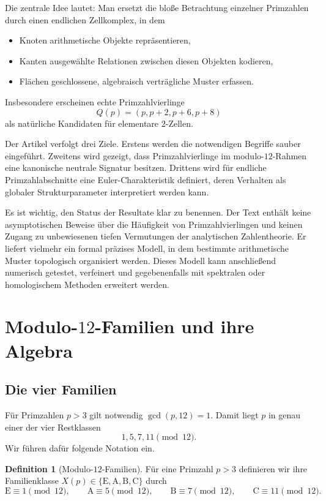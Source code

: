 \documentclass[11pt,a4paper]{article}
\theoremstyle{definition}
\newtheorem{definition}[theorem]{Definition}
\theoremstyle{remark}
\newcommand{\Efam}{\mathrm{E}}
\newcommand{\Afam}{\mathrm{A}}
\newcommand{\Bfam}{\mathrm{B}}
\newcommand{\Cfam}{\mathrm{C}}
\begin{document}
	Die zentrale Idee lautet: Man ersetzt die bloße Betrachtung einzelner Primzahlen durch einen endlichen Zellkomplex, in dem
	\begin{itemize}[itemsep=0.2em]
		\item Knoten arithmetische Objekte repräsentieren,
		\item Kanten ausgewählte Relationen zwischen diesen Objekten kodieren,
		\item Flächen geschlossene, algebraisch verträgliche Muster erfassen.
	\end{itemize}
	Insbesondere erscheinen echte Primzahlvierlinge
	\[
	Q(p)=(p,p+2,p+6,p+8)
	\]
	als natürliche Kandidaten für elementare $2$-Zellen.
	
	Der Artikel verfolgt drei Ziele. Erstens werden die notwendigen Begriffe sauber eingeführt. Zweitens wird gezeigt, dass Primzahlvierlinge im modulo-$12$-Rahmen eine kanonische neutrale Signatur besitzen. Drittens wird für endliche Primzahlabschnitte eine Euler-Charakteristik definiert, deren Verhalten als globaler Strukturparameter interpretiert werden kann.
	
	Es ist wichtig, den Status der Resultate klar zu benennen. Der Text enthält keine asymptotischen Beweise über die Häufigkeit von Primzahlvierlingen und keinen Zugang zu unbewiesenen tiefen Vermutungen der analytischen Zahlentheorie. Er liefert vielmehr ein formal präzises Modell, in dem bestimmte arithmetische Muster topologisch organisiert werden. Dieses Modell kann anschließend numerisch getestet, verfeinert und gegebenenfalls mit spektralen oder homologischem Methoden erweitert werden.
	
	\section{Modulo-$12$-Familien und ihre Algebra}
	
	\subsection{Die vier Familien}
	
	Für Primzahlen $p>3$ gilt notwendig $\gcd(p,12)=1$. Damit liegt $p$ in genau einer der vier Restklassen
	\[
	1,5,7,11 \pmod{12}.
	\]
	Wir führen dafür folgende Notation ein.
	
	\begin{definition}[Modulo-$12$-Familien]
		Für eine Primzahl $p>3$ definieren wir ihre Familienklasse $X(p)\in\{\Efam,\Afam,\Bfam,\Cfam\}$ durch
		\[
		\Efam \equiv 1 \pmod{12},\qquad
		\Afam \equiv 5 \pmod{12},\qquad
		\Bfam \equiv 7 \pmod{12},\qquad
		\Cfam \equiv 11 \pmod{12}.
		\]
	\end{definition}
	
\end{document}
